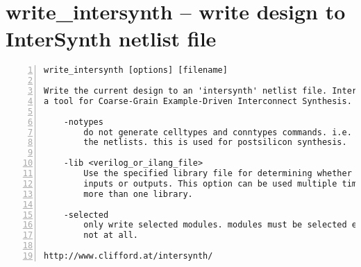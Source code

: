 \section{write\_intersynth -- write design to InterSynth netlist file}
\label{cmd:write_intersynth}
\begin{lstlisting}[numbers=left,frame=single]
    write_intersynth [options] [filename]

Write the current design to an 'intersynth' netlist file. InterSynth is
a tool for Coarse-Grain Example-Driven Interconnect Synthesis.

    -notypes
        do not generate celltypes and conntypes commands. i.e. just output
        the netlists. this is used for postsilicon synthesis.

    -lib <verilog_or_ilang_file>
        Use the specified library file for determining whether cell ports are
        inputs or outputs. This option can be used multiple times to specify
        more than one library.

    -selected
        only write selected modules. modules must be selected entirely or
        not at all.

http://www.clifford.at/intersynth/
\end{lstlisting}


